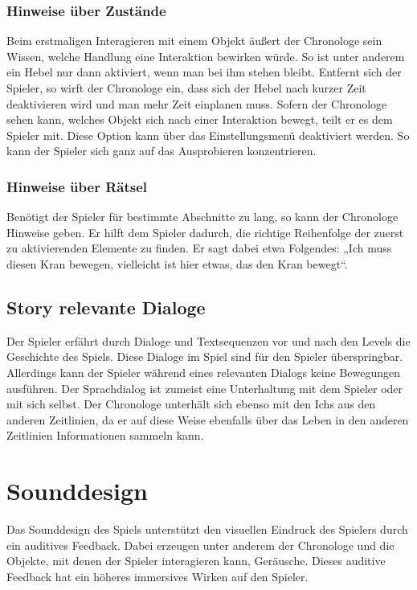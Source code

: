 \subsubsection{Hinweise über Zustände}
Beim erstmaligen Interagieren mit einem Objekt äußert der Chronologe sein Wissen, welche Handlung eine Interaktion bewirken würde. So ist unter anderem ein Hebel nur dann aktiviert, wenn man bei ihm stehen bleibt. Entfernt sich der Spieler, so wirft der Chronologe ein, dass sich der Hebel nach kurzer Zeit deaktivieren wird und man mehr Zeit einplanen muss. Sofern der Chronologe sehen kann, welches Objekt sich nach einer Interaktion bewegt, teilt er es dem Spieler mit. Diese Option kann über das Einstellungsmenü deaktiviert werden. So kann der Spieler sich ganz auf das Ausprobieren konzentrieren.

\subsubsection{Hinweise über Rätsel}
Benötigt der Spieler für bestimmte Abschnitte zu lang, so kann der Chronologe Hinweise geben. Er hilft dem Spieler dadurch, die richtige Reihenfolge der zuerst zu aktivierenden Elemente zu finden. Er sagt dabei etwa Folgendes: „Ich muss diesen Kran bewegen, vielleicht ist hier etwas, das den Kran bewegt“. 

\subsection{Story relevante Dialoge}
Der Spieler erfährt durch Dialoge und Textsequenzen vor und nach den Levels die Geschichte des Spiels. Diese Dialoge im Spiel sind für den Spieler überspringbar. Allerdings kann der Spieler während eines relevanten Dialogs keine Bewegungen ausführen. Der Sprachdialog ist zumeist eine Unterhaltung mit dem Spieler oder mit sich selbst. Der Chronologe unterhält sich ebenso mit den Ichs aus den anderen Zeitlinien, da er auf diese Weise ebenfalls über das Leben in den anderen Zeitlinien Informationen sammeln kann.
\section{Sounddesign}
Das Sounddesign des Spiels unterstützt den visuellen Eindruck des Spielers durch ein auditives Feedback. Dabei erzeugen unter anderem der Chronologe und die Objekte, mit denen der Spieler interagieren kann, Geräusche. Dieses auditive Feedback hat ein höheres immersives Wirken auf den Spieler.

